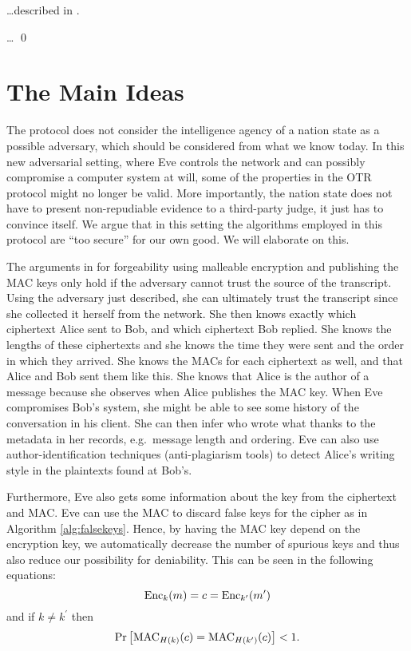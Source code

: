 \dots described in \cite{multiotr2009}.

\begin{protocol}
  \dots
  \qed
\end{protocol}


\section{The Main Ideas}

The protocol does not consider the intelligence agency of a nation state as 
a possible adversary, which should be considered from what we know today.
In this new adversarial setting, where Eve controls the network and can 
possibly compromise a computer system at will, some of the properties in the 
\ac{OTR} protocol might no longer be valid.
More importantly, the nation state does not have to present non-repudiable 
evidence to a third-party judge, it just has to convince itself.
We argue that in this setting the algorithms employed in this protocol are 
\enquote{too secure} for our own good.
We will elaborate on this.

The arguments in \cite{otr2004} for forgeability using malleable encryption and 
publishing the \ac{MAC} keys only hold if the adversary cannot trust the source 
of the transcript.
Using the adversary just described, she can ultimately trust the transcript 
since she collected it herself from the network.
She then knows exactly which ciphertext Alice sent to Bob, and which ciphertext 
Bob replied.
She knows the lengths of these ciphertexts and she knows the time they were 
sent and the order in which they arrived.
She knows the \acp{MAC} for each ciphertext as well, and that Alice and Bob 
sent them like this.
She knows that Alice is the author of a message because she observes when Alice 
publishes the \ac{MAC} key.
When Eve compromises Bob's system, she might be able to see some history of the 
conversation in his client.
She can then infer who wrote what thanks to the metadata in her records, e.g.\ 
message length and ordering.
Eve can also use author-identification techniques (anti-plagiarism tools) to 
detect Alice's writing style in the plaintexts found at Bob's.

Furthermore, Eve also gets some information about the key from the ciphertext 
and \ac{MAC}.
Eve can use the \ac{MAC} to discard false keys for the cipher as in Algorithm 
\ref{alg:falsekeys}.
Hence, by having the \ac{MAC} key depend on the encryption key, we 
automatically decrease the number of spurious keys and thus also reduce our 
possibility for deniability.
This can be seen in the following equations:
\begin{equation*}
  \operatorname{\mathrm{Enc}}_k( m ) = c = \operatorname{\mathrm{Enc}}_{k^\prime}( m^\prime )
\end{equation*}
and if \(k\neq k^\prime\) then
\begin{equation*}
  \Pr\left[
    \operatorname{\mathrm{MAC}}_{H(k)}( c ) = \operatorname{\mathrm{MAC}}_{H(k^\prime)}( c )
  \right] < 1.
\end{equation*}


